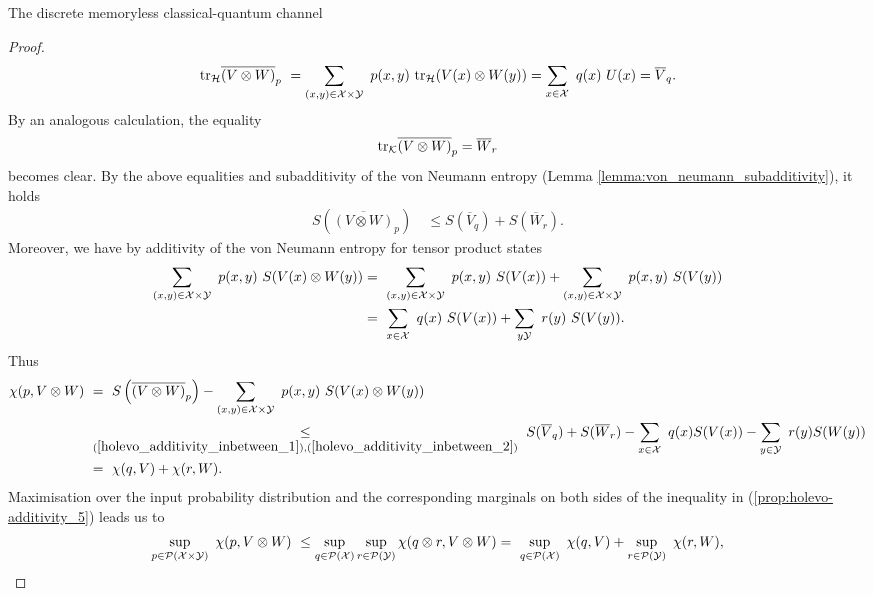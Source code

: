 \begin{section}{The discrete memoryless  classical-quantum channel}
\begin{proof}
\begin{align*}
       \mathrm{tr}_{{\mathcal H}} \overline{(V \otimes W)}_p \ = \sum_{(x,y) \in {\mathcal X} \times {\mathcal Y}} \ p(x,y) \ \mathrm{tr}_{{\mathcal H}}(V(x) \otimes W(y))  = \sum_{x \in {\mathcal X}} \ q(x) \ U(x) = \overline{V}_q.
      \end{align*}
      By an analogous calculation, the equality 
      \begin{align*}
       \mathrm{tr}_{{\mathcal K}} \overline{(V \otimes W)}_p = \overline{W}_r
      \end{align*}
      becomes clear. By the above equalities and subadditivity of the von Neumann entropy (Lemma \ref{lemma:von_neumann_subadditivity}), it holds
      \begin{align}
       S\left( \overline{(V \otimes W)}_p \right) \ & \leq S(\overline{V}_q) + S(\overline{W}_r).
		\label{holevo_additivity_inbetween_1}
      \end{align}
      Moreover, we have by additivity of the von Neumann entropy for tensor product states
      \begin{align}
       \sum_{(x,y) \in \cX \times \cY} \ p(x,y) \ S(V(x) \otimes W(y))
        &= \ \sum_{(x,y) \in \cX \times \cY} \ p(x,y) \ S(V(x)) + \sum_{(x,y) \in \cX \times \cY} \ p(x,y) \ S(V(y)) \nonumber \\
        &= \ \sum_{x \in \cX } \ q(x) \ S(V(x)) + \sum_{y \cY} \ r(y) \ S(V(y)). 
        \label{holevo_additivity_inbetween_2}
      \end{align}
       Thus
       \begin{align}
        \chi(p, V \otimes W) \
        & = \ S\left(\overline{(V \otimes W)}_p\right) - \sum_{(x,y) \in {\mathcal X} \times {\mathcal Y}} \ 	p(x,y) \ S(V(x) \otimes W(y)) \nonumber \\
        & \underset{(\ref{holevo_additivity_inbetween_1}),(\ref{holevo_additivity_inbetween_2})}{\leq} \ S(\overline{V}_q) + S(\overline{W}_r) - \sum_{x \in {\mathcal X}} \ q(x) S(V(x)) - \sum_{y \in {\mathcal Y}} \ r(y) S(W(y)) \nonumber \\
        & = \ \chi(q,V) + \chi(r,W). \label{prop:holevo-additivity_5}
       \end{align}
       Maximisation over the input probability distribution and the corresponding marginals on both sides of the inequality in (\ref{prop:holevo-additivity_5}) leads us to 
       \begin{align*}
        \sup_{p \in \cP(\cX \times \cY)} \ \chi(p, V \otimes W) \ 
       \leq \sup_{q \in \cP(\cX)}\sup_{r \in \cP(\cY)} \chi(q \otimes r, V \otimes W) 
       = \ \sup_{q \in \cP(\cX)} \ \chi(q, V) + \sup_{r \in \cP(\cY)} \ \chi(r,W),
       \end{align*}

\end{proof}
\end{section}
